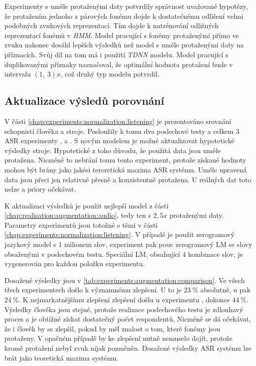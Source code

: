 Experimenty s uměle protaženými daty potvrdily správnost uvažované hypotézy, že protažením jednoho z párových fonému dojde k dostatečnému odlišení velmi podobných zvukových reprezentací. Tím dojde k natrénování odlišných reprezentací fonémů v \textit{HMM}. Model pracující s fonémy protaženými přímo ve zvuku nakonec dosáhl lepších výsledků než model s uměle protaženými daty na příznacích. Svůj díl na tom má i použití \textit{TDNN} modelu. Model pracující s duplikovanými příznaky naznačoval, že optimální hodnota protažení bude v intervalu $\left(1,\ 3\right)x$, což druhý typ modelu potvrdil.

\subsection{Aktualizace výsledů porovnání}
\label{chap:realisation:augmentation:comparison}

V části \ref{chap:experiments:normalization:listening} je prezentováno srovnání schopnistí člověka a stroje. Posloužily k tomu dva poslechové testy a celkem $3$ ASR experimenty ,  a . S novým modelem je možné aktualizovat hypotetické výsledky stroje. Hypotetické z toho důvodu, že použitá data jsou uměle protažena. Nicméně to nebrání tomu tento experiment, protože získané hodnoty mohou být brány jako jakési teroretická maxima ASR systému. Uměle upravená data jsou přeci jen relativně přesně a konzistentně protažena. U reálných dat toto nelze a priory očekávat.

K aktualizaci výsledků je použit nejlepší model z části \ref{chap:realisation:augmentation:audio}, tedy ten s $2,5x$ protaženými daty. Parametry experimentů jsou totožné s těmi v části \ref{chap:experiments:normalization:listening}. V případě  je použit zerogramový jazykový model s 1 milionem slov,  experiment pak poue zerogramový LM se slovy obsaženými v poslechovém testu. Speciální LM, obsahující 4 kombinace slov, je vygenerován pro každou položku  experimentu.

Dosažené výsledky jsou v \ref{tab:experiments:augmentation:comparison}. Ve všech třech experimentech došlo k významnému zlepšení. U  to je $23\ \%$ absolutně, u  pak $24\ \%$. K nejmarkatnějšímu zlepšení zlepšení došlu u experimentu , dokonce $44\ \%$. Výsledky člověka jsou stejné, protože realizace poslechového testu je zdlouhavý proces a je obtížné získat dostatečný počet respondentů. Nicméně se dá očekávat, že i člověk by se zlepšil, pokud by měl znalost o tom, které fonémy jsou protaženy. V opačném případě by ke zlepšení nutně nemuselo dojít, protože kromě protažení nebyl zvuk nijak pozměněn. Dosažené výsledky ASR systému lze brát jako teoretická maxima systému.

